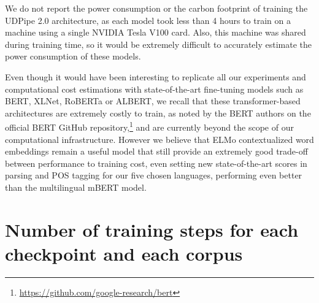 We do not report the power consumption or the carbon footprint of training the UDPipe 2.0 architecture, as each model took less than 4 hours to train on a machine using a single NVIDIA Tesla V100 card. Also, this machine was shared during training time, so it would be extremely difficult to accurately estimate the power consumption of these models.

Even though it would have been interesting to replicate all our experiments and computational cost estimations with state-of-the-art fine-tuning models such as BERT, XLNet, RoBERTa or ALBERT, we recall that these transformer-based architectures are extremely costly to train, as noted by the BERT authors on the official BERT GitHub repository,\footnote{\url{https://github.com/google-research/bert}} and are currently beyond the scope of our computational infrastructure. However we believe that ELMo contextualized word embeddings remain a useful model that still provide an extremely good trade-off between performance to training cost, even setting new state-of-the-art scores in parsing and POS tagging for our five chosen languages, performing even better than the multilingual mBERT model.

\section{Number of training steps for each checkpoint and each corpus}

